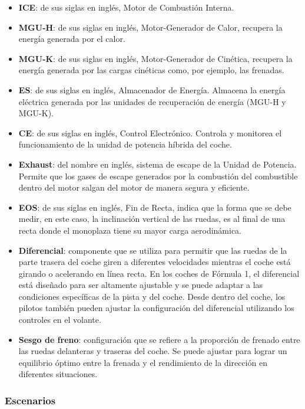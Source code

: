 \documentclass[12pt,a4paper,twoside,spanish]{article}      %
\begin{document}
\begin{itemize}
    \item \textbf{ICE}: de sus siglas en inglés, Motor de Combustión Interna.
    \item \textbf{MGU-H}: de sus siglas en inglés, Motor-Generador de Calor, recupera la energía generada por el calor.
    \item \textbf{MGU-K}: de sus siglas en inglés, Motor-Generador de Cinética, recupera la energía generada por las cargas cinéticas como, por ejemplo, las frenadas.
    \item \textbf{ES}: de sus siglas en inglés, Almacenador de Energía. Almacena la energía eléctrica generada por las unidades de recuperación de energía (MGU-H y MGU-K). 
    \item \textbf{CE}: de sus siglas en inglés, Control Electrónico. Controla y monitorea el funcionamiento de la unidad de potencia híbrida del coche.
    \item \textbf{Exhaust}: del nombre en inglés, sistema de escape de la Unidad de Potencia. Permite que los gases de escape generados por la combustión del combustible dentro del motor salgan del motor de manera segura y eficiente.
    \item \textbf{EOS}: de sus siglas en inglés, Fin de Recta, indica que la forma que se debe medir, en este caso, la inclinación vertical de las ruedas, es al final de una recta donde el monoplaza tiene su mayor carga aerodinámica.
    \item \textbf{Diferencial}: componente que se utiliza para permitir que las ruedas de la parte trasera del coche giren a diferentes velocidades mientras el coche está girando o acelerando en línea recta. En los coches de Fórmula 1, el diferencial está diseñado para ser altamente ajustable y se puede adaptar a las condiciones específicas de la pista y del coche. Desde dentro del coche, los pilotos también pueden ajustar la configuración del diferencial utilizando los controles en el volante.
    \item \textbf{Sesgo de freno}: configuración que se refiere a la proporción de frenado entre las ruedas delanteras y traseras del coche. Se puede ajustar para lograr un equilibrio óptimo entre la frenada y el rendimiento de la dirección en diferentes situaciones.
\end{itemize}

\subsubsection{Escenarios}
\end{document}
